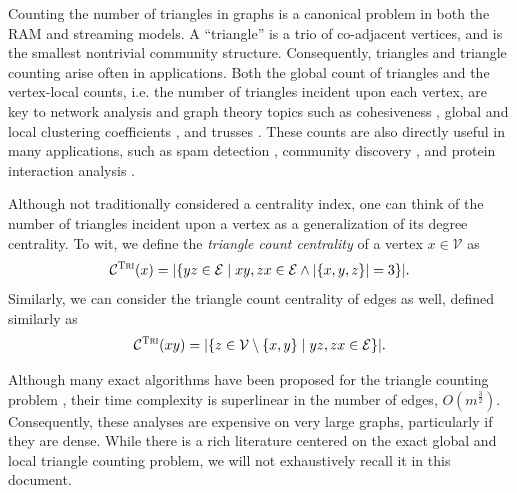 \documentclass{report}
\newcommand{\algoname}[1]{\textnormal{\textsc{#1}}}
\begin{document}
Counting the number of triangles in graphs is a canonical problem in both the RAM and streaming models.
A ``triangle'' is a trio of co-adjacent vertices, and is the smallest nontrivial community structure.
Consequently, triangles and triangle counting arise often in applications.
Both the global count of triangles and the vertex-local counts, i.e. the number of triangles incident upon each vertex, are key to network analysis and graph theory topics such as cohesiveness \cite{lim2015mascot}, global and local clustering coefficients \cite{tsourakakis2008fast}, and trusses \cite{cohen2008trusses}.
These counts are also directly useful in many applications, such as spam detection \cite{becchetti2010efficient},  community discovery \cite{wang2010triangulation, berry2011tolerating}, and protein interaction analysis \cite{milo2002network}.

Although not traditionally considered a centrality index, one can think of the number of triangles incident upon a vertex as a generalization of its degree centrality. 
To wit, we define the \emph{triangle count centrality} of a vertex $x \in \mathcal{V}$ as
%
\begin{equation}
	\mathcal{C}^{\algoname{Tri}}(x) = |\{yz \in \mathcal{E} \mid xy, zx \in \mathcal{E} \wedge |\{x, y, z\}| = 3\}|.
\end{equation}
%
Similarly, we can consider the triangle count centrality of edges as well, defined similarly as
%
\begin{equation}
	\mathcal{C}^{\algoname{Tri}}(xy) = |\{z \in \mathcal{V} \setminus \{x,y\} \mid yz, zx \in \mathcal{E}\}|.
\end{equation}
%

Although many exact algorithms have been proposed for the triangle counting problem \cite{tsourakakis2008fast, becchetti2010efficient, chu2011triangle, suri2011counting, wolf2017fast}, their time complexity is superlinear in the number of edges, $O(m^{
\frac{3}{2}})$.
Consequently, these analyses are expensive on very large graphs, particularly if they are dense.
While there is a rich literature centered on the exact global and local triangle counting problem, we will not exhaustively recall it in this document.
\end{document}
